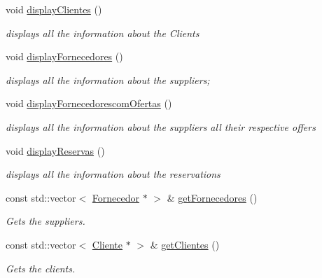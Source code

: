 \begin{DoxyCompactItemize}
\mbox{\label{classEmpresa_a28e04d59daa7206bec6055249ce17410}} 
void \hyperlink{classEmpresa_a28e04d59daa7206bec6055249ce17410}{display\+Clientes} ()
\begin{DoxyCompactList}\small\item\em displays all the information about the Clients \end{DoxyCompactList}\item 
\mbox{\label{classEmpresa_a55c3756c01b45b41ad03f4e4f3e4dcac}} 
void \hyperlink{classEmpresa_a55c3756c01b45b41ad03f4e4f3e4dcac}{display\+Fornecedores} ()
\begin{DoxyCompactList}\small\item\em displays all the information about the suppliers; \end{DoxyCompactList}\item 
\mbox{\label{classEmpresa_aa47e9a64800a41180b7f374b73a1f32b}} 
void \hyperlink{classEmpresa_aa47e9a64800a41180b7f374b73a1f32b}{display\+Fornecedorescom\+Ofertas} ()
\begin{DoxyCompactList}\small\item\em displays all the information about the suppliers all their respective offers \end{DoxyCompactList}\item 
\mbox{\label{classEmpresa_a8c89e6053eaccf0e1938a4f2ab0bfdc4}} 
void \hyperlink{classEmpresa_a8c89e6053eaccf0e1938a4f2ab0bfdc4}{display\+Reservas} ()
\begin{DoxyCompactList}\small\item\em displays all the information about the reservations \end{DoxyCompactList}\item 
const std\+::vector$<$ \hyperlink{classFornecedor}{Fornecedor} $\ast$ $>$ \& \hyperlink{classEmpresa_aaf131a375aa70819205744328a4dbc07}{get\+Fornecedores} ()
\begin{DoxyCompactList}\small\item\em Gets the suppliers. \end{DoxyCompactList}\item 
const std\+::vector$<$ \hyperlink{classCliente}{Cliente} $\ast$ $>$ \& \hyperlink{classEmpresa_a472beae89ee1187e1ec3f70e9d4a99ef}{get\+Clientes} ()
\begin{DoxyCompactList}\small\item\em Gets the clients. \end{DoxyCompactList}\item 

\end{DoxyCompactItemize}
